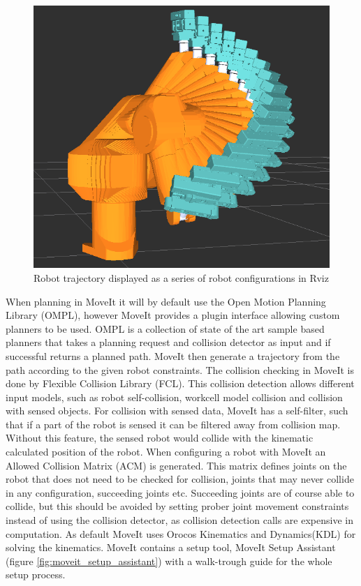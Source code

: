 \begin{figure}[htb]
	\begin{center}
		\includegraphics[scale=0.5,trim=0 0 0 0]{graphics/05_robotics/robot_trajectory.png}%
		\caption{Robot trajectory displayed as a series of robot configurations in Rviz}
		\label{fig:robot_trajectory}
	\end{center}
\end{figure}

When planning in MoveIt it will by default use the Open Motion Planning Library (OMPL), however MoveIt provides a plugin interface allowing custom planners to be used. OMPL is a collection of state of the art sample based planners that takes a planning request and collision detector as input and if successful returns a planned path. MoveIt then generate a trajectory from the path according to the given robot constraints. The collision checking in MoveIt is done by Flexible Collision Library (FCL). This collision detection allows different input models, such as robot self-collision, workcell model collision and collision with sensed objects. For collision with sensed data, MoveIt has a self-filter, such that if a part of the robot is sensed it can be filtered away from collision map. Without this feature, the sensed robot would collide with the kinematic calculated position of the robot. When configuring a robot with MoveIt an Allowed Collision Matrix (ACM) is generated. This matrix defines joints on the robot that does not need to be checked for collision, joints that may never collide in any configuration, succeeding joints etc. Succeeding joints are of course able to collide, but this should be avoided by setting prober joint movement constraints instead of using the collision detector, as collision detection calls are expensive in computation. As default MoveIt uses Orocos Kinematics and Dynamics(KDL) for solving the kinematics. MoveIt contains a setup tool, MoveIt Setup Assistant (figure \ref{fig:moveit_setup_assistant}) with a walk-trough guide for the whole setup process.

